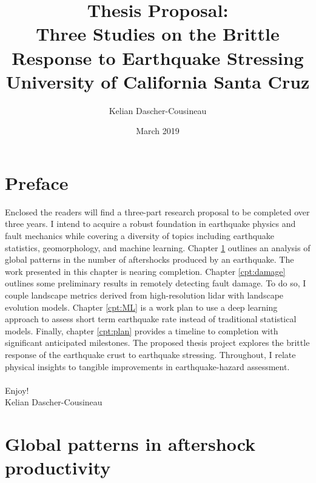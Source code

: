 \documentclass[12pt, notitlepage]{report}
\title{
{Thesis Proposal:}\\
{Three Studies on the Brittle Response to Earthquake Stressing} \\
{\large University of California Santa Cruz}
}
\date{March 2019}
\author{Kelian Dascher-Cousineau}
\begin{document}
\maketitle

\tableofcontents{}

\chapter*{Preface}

Enclosed the readers will find a three-part research proposal to be completed over three years. I intend to acquire a robust foundation in earthquake physics and fault mechanics while covering a diversity of topics including earthquake statistics, geomorphology, and machine learning. Chapter \ref{cpt:productivity} outlines an analysis of global patterns in the number of aftershocks produced by an earthquake. The work presented in this chapter is nearing completion. Chapter \ref{cpt:damage} outlines some preliminary results in remotely detecting fault damage. To do so, I couple landscape metrics derived from high-resolution lidar with landscape evolution models. Chapter \ref{cpt:ML} is a work plan to use a deep learning approach to assess short term earthquake rate instead of traditional statistical models. Finally, chapter \ref{cpt:plan} provides a timeline to completion with significant anticipated milestones. The proposed thesis project explores the brittle response of the earthquake crust to earthquake stressing. Throughout, I relate physical insights to tangible improvements in earthquake-hazard assessment. 
\\
\\
Enjoy!
\\
Kelian Dascher-Cousineau

\newpage
 
\chapter{Global patterns in aftershock productivity}\label{cpt:productivity}
\end{document}
